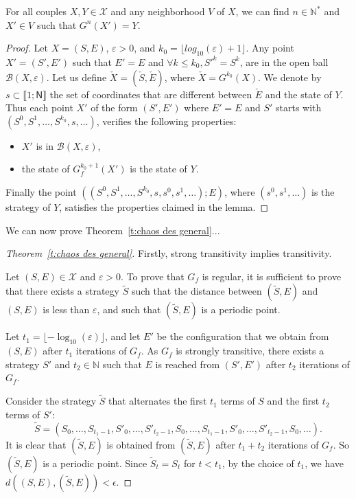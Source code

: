 \documentclass{article}
\begin{document}
\begin{lemma}
\label{strongTrans}
 For all couples $X,Y \in \mathcal{X}$ and any neighborhood $V$ of $X$, we can 
find $n \in \mathds{N}^*$ and $X' \in V$ such that $G^n(X')=Y$.
\end{lemma}

\begin{proof}
 Let $X=(S,E)$, $\varepsilon>0$, and $k_0 = \lfloor log_{10}(\varepsilon)+1 \rfloor$. 
Any point $X'=(S',E')$ such that $E'=E$ and $\forall k \leqslant k_0, S'^k=S^k$, 
are in the open ball $\mathcal{B}\left(X,\varepsilon\right)$. Let us define 
$\check{X} = \left(\check{S},\check{E}\right)$, where $\check{X}= G^{k_0}(X)$.
We denote by $s\subset \llbracket 1; \mathsf{N} \rrbracket$ the set of coordinates
that are different between $\check{E}$ and the state of $Y$. Thus each point $X'$ of
the form $(S',E')$ where $E'=E$ and $S'$ starts with 
$(S^0, S^1, \hdots, S^{k_0},s,\hdots)$, verifies the following properties:
\begin{itemize}
 \item $X'$ is in $\mathcal{B}\left(X,\varepsilon\right)$,
 \item the state of $G_f^{k_0+1}(X')$ is the state of $Y$.
\end{itemize}
Finally the point $\left(\left(S^0, S^1, \hdots, S^{k_0},s,s^0, s^1, \hdots\right); E\right)$, 
where $(s^0,s^1, \hdots)$ is the strategy of $Y$, satisfies the properties
claimed in the lemma.
\end{proof}

We can now prove Theorem~\ref{t:chaos des general}...

\begin{proof}[Theorem~\ref{t:chaos des general}]
Firstly, strong transitivity implies transitivity.

Let $(S,E) \in\mathcal{X}$ and $\varepsilon >0$. To
prove that $G_f$ is regular, it is sufficient to prove that
there exists a strategy $\tilde S$ such that the distance between
$(\tilde S,E)$ and $(S,E)$ is less than $\varepsilon$, and such that
$(\tilde S,E)$ is a periodic point.

Let $t_1=\lfloor-\log_{10}(\varepsilon)\rfloor$, and let $E'$ be the
configuration that we obtain from $(S,E)$ after $t_1$ iterations of
$G_f$. As $G_f$ is strongly transitive, there exists a strategy $S'$ 
and $t_2\in\mathds{N}$ such
that $E$ is reached from $(S',E')$ after $t_2$ iterations of $G_f$.

Consider the strategy $\tilde S$ that alternates the first $t_1$ terms
of $S$ and the first $t_2$ terms of $S'$: $$\tilde
S=(S_0,\dots,S_{t_1-1},S'_0,\dots,S'_{t_2-1},S_0,\dots,S_{t_1-1},S'_0,\dots,S'_{t_2-1},S_0,\dots).$$ It
is clear that $(\tilde S,E)$ is obtained from $(\tilde S,E)$ after
$t_1+t_2$ iterations of $G_f$. So $(\tilde S,E)$ is a periodic
point. Since $\tilde S_t=S_t$ for $t<t_1$, by the choice of $t_1$, we
have $d((S,E),(\tilde S,E))<\epsilon$.
\end{proof}
\end{document}
